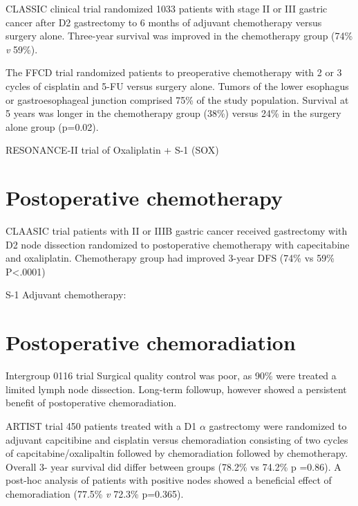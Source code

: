\documentclass[
]{book}
\begin{document}
CLASSIC clinical trial randomized 1033 patients with stage II or III gastric cancer after D2 gastrectomy to 6 months of adjuvant chemotherapy versus surgery alone. Three-year survival was improved in the chemotherapy group (74\% \emph{v} 59\%).\citep{bang315}

The FFCD trial randomized patients to preoperative chemotherapy with 2 or 3 cycles of cisplatin and 5-FU versus surgery alone. Tumors of the lower esophagus or gastroesophageal junction comprised 75\% of the study population. Survival at 5 years was longer in the chemotherapy group (38\%) versus 24\% in the surgery alone group (p=0.02).\citep{ychou1715}

RESONANCE-II trial of Oxaliplatin + S-1 (SOX) \citep{wang20}

\hypertarget{postoperative-chemotherapy}{%
\section{Postoperative chemotherapy}\label{postoperative-chemotherapy}}

CLAASIC trial \citep{noh1389} \citep{bang315} patients with II or IIIB gastric cancer received gastrectomy with D2 node dissection randomized to postoperative chemotherapy with capecitabine and oxaliplatin. Chemotherapy group had improved 3-year DFS (74\% vs 59\% P\textless.0001)

S-1 Adjuvant chemotherapy: \citep{sasako4387}

\hypertarget{postoperative-chemoradiation-1}{%
\section{Postoperative chemoradiation}\label{postoperative-chemoradiation-1}}

Intergroup 0116 trial \citep{macdonald725} \citep{smalley2327}
Surgical quality control was poor, as 90\% were treated a limited lymph node dissection. Long-term followup, however \citep{smalley2327} showed a persistent benefit of postoperative chemoradiation.

ARTIST trial 450 patients treated with a D1 \(\alpha\) gastrectomy were randomized to adjuvant capcitibine and cisplatin versus chemoradiation consisting of two cycles of capcitabine/oxalipaltin followed by chemoradiation followed by chemotherapy. Overall 3- year survival did differ between groups (78.2\% vs 74.2\% p =0.86). A post-hoc analysis of patients with positive nodes showed a beneficial effect of chemoradiation (77.5\% \emph{v} 72.3\% p=0.365).\citep{lee268}
\end{document}
